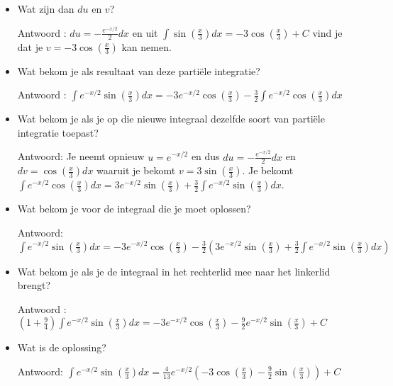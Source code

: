 \begin{enumerate}
\begin{itemize}
		\item Wat zijn dan $du$ en $v$?
		
		Antwoord : $du=-\frac{e^{-x/2}}{2}dx$ en uit $\int \sin \left( \frac{x}{3}  \right)dx=-3 \cos \left( \frac{x}{3}  \right)+C$ vind je dat je $v=-3 \cos \left( \frac{x}{3}  \right)$ kan nemen.
		
		\item Wat bekom je als resultaat van deze parti\"ele integratie?
		
		Antwoord :  $\int e^{-x/2}\sin \left( \frac{x}{3}  \right)dx=-3e^{-x/2} \cos \left( \frac{x}{3}  \right)-\frac{3}{2} \int e^{-x/2}\cos \left( \frac{x}{3}  \right)dx$
		
		\item Wat bekom je als je op die nieuwe integraal dezelfde soort van parti\"ele integratie toepast?
		
		Antwoord: Je neemt opnieuw $u=e^{-x/2}$ en dus $du=-\frac{e^{-x/2}}{2}dx$ en $dv=\cos \left( \frac{x}{3}  \right)dx$ waaruit je bekomt $v=3 \sin \left( \frac{x}{3}  \right)$.
		Je bekomt $\int e^{-x/2}\cos \left( \frac{x}{3}  \right)dx=3e^{-x/2}\sin \left( \frac{x}{3}  \right)+\frac{3}{2}\int e^{-x/2}\sin \left( \frac{x}{3}  \right)dx$.
		
		\item Wat bekom je voor de integraal die je moet oplossen?
		
		Antwoord: $\int e^{-x/2}\sin \left( \frac{x}{3}  \right)dx=-3e^{-x/2} \cos \left( \frac{x}{3}  \right)-\frac{3}{2} \left(  3e^{-x/2}\sin \left( \frac{x}{3}  \right)+\frac{3}{2}\int e^{-x/2}\sin \left( \frac{x}{3}  \right)dx \right)$
		
		\item Wat bekom je als je de integraal in het rechterlid mee naar het linkerlid brengt?
		
		Antwoord : $\left(  1+\frac{9}{4} \right)\int e^{-x/2}\sin \left( \frac{x}{3}  \right)dx=-3e^{-x/2} \cos \left( \frac{x}{3}  \right)-\frac{9}{2} e^{-x/2}\sin \left( \frac{x}{3}  \right)+C$
		
		\item Wat is de oplossing?
		
		Antwoord: $\int e^{-x/2}\sin \left( \frac{x}{3}  \right)dx=\frac{4}{13}e^{-x/2} \left( -3 \cos \left( \frac{x}{3}  \right)-\frac{9}{2}\sin \left( \frac{x}{3}  \right) \right)+C$
		
	\end{itemize}
	
\end{enumerate}


